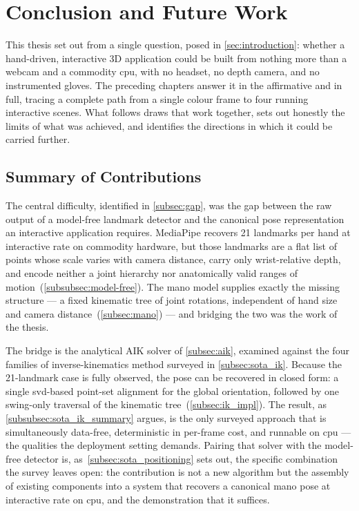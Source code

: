 
\section{Conclusion and Future Work}\label{sec:conclusion}

This thesis set out from a single question, posed in \autoref{sec:introduction}:
whether a hand-driven, interactive 3D application could be built from nothing more
than a webcam and a commodity \acrshort{cpu}, with no headset, no depth camera, and
no instrumented gloves. The preceding chapters answer it in the affirmative and in
full, tracing a complete path from a single colour frame to four running interactive
scenes. What follows draws that work together, sets out honestly the limits of what
was achieved, and identifies the directions in which it could be carried further.

\subsection{Summary of Contributions}\label{subsec:conclusion_summary}

The central difficulty, identified in \autoref{subsec:gap}, was the gap between the
raw output of a model-free landmark detector and the canonical pose representation an
interactive application requires. MediaPipe \cite{zhang2020mediapipehands} recovers
21 landmarks per hand at interactive rate on commodity hardware, but those landmarks
are a flat list of points whose scale varies with camera distance, carry only
wrist-relative depth, and encode neither a joint hierarchy nor anatomically valid
ranges of motion~(\autoref{subsubsec:model-free}). The \acrshort{mano} model
\cite{MANO:SIGGRAPHASIA:2017} supplies exactly the missing structure --- a fixed
kinematic tree of joint rotations, independent of hand size and camera
distance~(\autoref{subsec:mano}) --- and bridging the two was the work of the thesis.

The bridge is the analytical AIK solver of \autoref{subsec:aik}, examined against the
four families of inverse-kinematics method surveyed in \autoref{subsec:sota_ik}.
Because the 21-landmark case is fully observed, the pose can be recovered in closed
form: a single \acrshort{svd}-based point-set alignment for the global orientation,
followed by one swing-only traversal of the kinematic tree~(\autoref{subsec:ik_impl}).
The result, as \autoref{subsubsec:sota_ik_summary} argues, is the only surveyed
approach that is simultaneously data-free, deterministic in per-frame cost, and
runnable on \acrshort{cpu} --- the qualities the deployment setting demands.
Pairing that solver with the model-free detector is, as~\autoref{subsec:sota_positioning}
sets out, the specific combination the survey leaves open: the contribution is not a new
algorithm but the assembly of existing components into a system that recovers a
canonical \acrshort{mano} pose at interactive rate on \acrshort{cpu}, and the
demonstration that it suffices.

